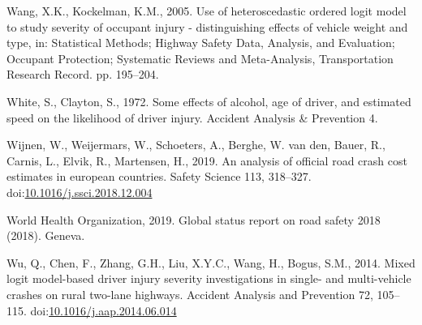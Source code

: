 \documentclass[]{elsarticle} %
\begin{document}
\leavevmode\hypertarget{ref-Wang2005use}{}%
Wang, X.K., Kockelman, K.M., 2005. Use of heteroscedastic ordered logit
model to study severity of occupant injury - distinguishing effects of
vehicle weight and type, in: Statistical Methods; Highway Safety Data,
Analysis, and Evaluation; Occupant Protection; Systematic Reviews and
Meta-Analysis, Transportation Research Record. pp. 195--204.

\leavevmode\hypertarget{ref-White1972effects}{}%
White, S., Clayton, S., 1972. Some effects of alcohol, age of driver,
and estimated speed on the likelihood of driver injury. Accident
Analysis \& Prevention 4.

\leavevmode\hypertarget{ref-Wijnen2019analysis}{}%
Wijnen, W., Weijermars, W., Schoeters, A., Berghe, W. van den, Bauer,
R., Carnis, L., Elvik, R., Martensen, H., 2019. An analysis of official
road crash cost estimates in european countries. Safety Science 113,
318--327.
doi:\href{https://doi.org/10.1016/j.ssci.2018.12.004}{10.1016/j.ssci.2018.12.004}

\leavevmode\hypertarget{ref-WHO2019global}{}%
World Health Organization, 2019. Global status report on road safety
2018 (2018). Geneva.

\leavevmode\hypertarget{ref-Wu2014mixed}{}%
Wu, Q., Chen, F., Zhang, G.H., Liu, X.Y.C., Wang, H., Bogus, S.M., 2014.
Mixed logit model-based driver injury severity investigations in single-
and multi-vehicle crashes on rural two-lane highways. Accident Analysis
and Prevention 72, 105--115.
doi:\href{https://doi.org/10.1016/j.aap.2014.06.014}{10.1016/j.aap.2014.06.014}
\end{document}
